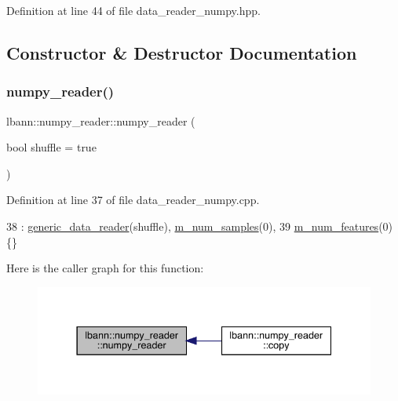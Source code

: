 Definition at line 44 of file data\+\_\+reader\+\_\+numpy.\+hpp.



\subsection{Constructor \& Destructor Documentation}
\mbox{\label{classlbann_1_1numpy__reader_a77718f4e8fad1e74289e5d446587ba83}} 
\subsubsection{\texorpdfstring{numpy\+\_\+reader()}{numpy\_reader()}\hspace{0.1cm}{\footnotesize\ttfamily [1/2]}}
{\footnotesize\ttfamily lbann\+::numpy\+\_\+reader\+::numpy\+\_\+reader (\begin{DoxyParamCaption}\item[{bool}]{shuffle = {\ttfamily true} }\end{DoxyParamCaption})}



Definition at line 37 of file data\+\_\+reader\+\_\+numpy.\+cpp.


\begin{DoxyCode}
38   : \hyperlink{classlbann_1_1generic__data__reader_aaba933b8f7c1227801f6e80d39986af4}{generic\_data\_reader}(shuffle), \hyperlink{classlbann_1_1numpy__reader_a5e0d81c07c950a2d81645566a2ccd965}{m\_num\_samples}(0),
39     \hyperlink{classlbann_1_1numpy__reader_aef25f95077f565fa9616ec353b93f675}{m\_num\_features}(0) \{\}
\end{DoxyCode}
Here is the caller graph for this function\+:\nopagebreak
\begin{figure}[H]
\begin{center}
\leavevmode
\includegraphics[width=337pt]{classlbann_1_1numpy__reader_a77718f4e8fad1e74289e5d446587ba83_icgraph}
\end{center}
\end{figure}
\mbox{\label{classlbann_1_1numpy__reader_a815062116605538898e9289ce2ec55ef}} 

